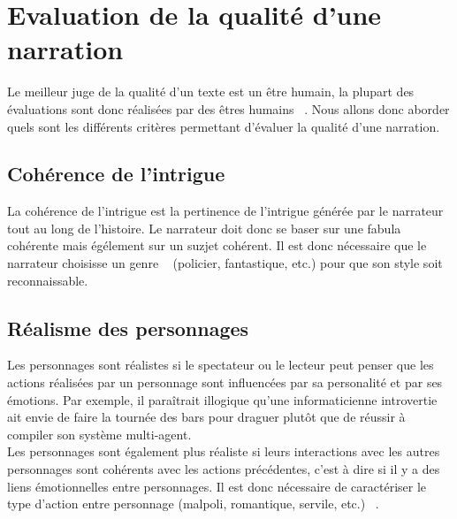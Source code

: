 \documentclass[asi]{picINSA}
\begin{document}
\section{Evaluation de la qualité d'une narration}

Le meilleur juge de la qualité d'un texte est un être humain, la plupart des évaluations sont donc réalisées par des êtres humains ~\cite{Callaway2002213}. Nous allons donc aborder quels sont les différents critères permettant d'évaluer la qualité d'une narration.

\subsection{Cohérence de l'intrigue}

La cohérence de l'intrigue est la pertinence de l'intrigue générée par le narrateur tout au long de l'histoire. Le narrateur doit donc se baser sur une fabula cohérente mais égélement sur un suzjet cohérent. Il est donc nécessaire que le narrateur choisisse un genre ~\cite{Ciarlini:2010:ERP:1658866.1658874} (policier, fantastique, etc.) pour que son style soit reconnaissable.

\subsection{Réalisme des personnages}

Les personnages sont réalistes si le spectateur ou le lecteur peut penser que les actions réalisées par un personnage sont influencées par sa personalité et par ses émotions. Par exemple, il paraîtrait illogique qu'une informaticienne introvertie ait envie de faire la tournée des bars pour draguer plutôt que de réussir à compiler son système multi-agent. \\

Les personnages sont également plus réaliste si leurs interactions avec les autres personnages sont cohérents avec les actions précédentes, c'est à dire si il y a des liens émotionnelles entre personnages. Il est donc nécessaire de caractériser le type d'action entre personnage (malpoli, romantique, servile, etc.) ~\cite{IRIS:conf/aamas/CavazzaCM2002}. \\


\end{document}
